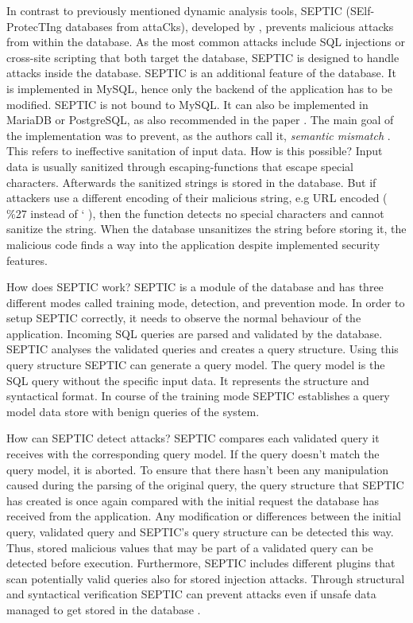 In contrast to previously mentioned dynamic analysis tools, SEPTIC (SElf-ProtecTIng databases from attaCks), developed by \textcite[]{Medeiros2019}, prevents malicious attacks from within the database. As the most common attacks include SQL injections or cross-site scripting that both target the database, SEPTIC is designed to handle attacks inside the database. SEPTIC is an additional feature of the database. It is implemented in MySQL, hence only the backend of the application has to be modified. SEPTIC is not bound to MySQL. It can also be implemented in MariaDB or PostgreSQL, as also recommended in the paper \autocite[1185]{Medeiros2019}.\newline
The main goal of the implementation was to prevent, as the authors call it, \textit{semantic mismatch} \autocite[1168]{Medeiros2019}. This refers to ineffective sanitation of input data. How is this possible? Input data is usually sanitized through escaping-functions that escape special characters. Afterwards the sanitized strings is stored in the database. But if attackers use a different encoding of their malicious string, e.g URL encoded ( \%27 instead of ` ), then the function detects no special characters and cannot sanitize the string. When the database unsanitizes the string before storing it, the malicious code finds a way into the application despite implemented security features.\newline


How does SEPTIC work? SEPTIC is a module of the database and has three different modes called training mode, detection, and prevention mode. In order to setup SEPTIC correctly, it needs to observe the normal behaviour of the application. Incoming SQL queries are parsed and validated by the database. SEPTIC analyses the validated queries and creates a query structure. Using this query structure SEPTIC can generate a query model. The query model is the SQL query without the specific input data. It represents the structure and syntactical format. In course of the training mode SEPTIC establishes a query model data store with benign queries of the system\autocite[1169-1172]{Medeiros2019}.\newline


How can SEPTIC detect attacks? SEPTIC compares each validated query it receives with the corresponding query model. If the query doesn't match the query model, it is aborted. To ensure that there hasn't been any manipulation caused during the parsing of the original query, the query structure that SEPTIC has created is once again compared with the initial request the database has received from the application. Any modification or differences between the initial query, validated query and SEPTIC's query structure can be detected this way. Thus, stored malicious values that may be part of a validated query can be detected before execution. Furthermore, SEPTIC includes different plugins that scan potentially valid queries also for stored injection attacks. Through structural and syntactical verification SEPTIC can prevent attacks even if unsafe data managed to get stored in the database \autocite[1173-1175]{Medeiros2019}.

